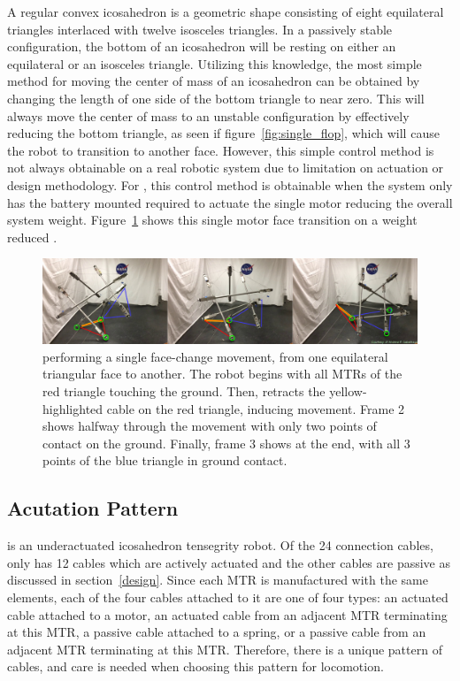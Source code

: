 A regular convex icosahedron is a geometric shape consisting of eight equilateral triangles interlaced with twelve isosceles triangles.
In a passively stable configuration, the bottom of an icosahedron will be resting on either an equilateral or an isosceles triangle.
Utilizing this knowledge, the most simple method for moving the center of mass of an icosahedron can be obtained by changing the length of one side of the bottom triangle to near zero.
This will always move the center of mass to an unstable configuration by effectively reducing the bottom triangle, as seen if figure~\ref{fig:single_flop}, which will cause the robot to transition to another face.
However, this simple control method is not always obtainable on a real robotic system due to limitation on actuation or design methodology.
For \SB{}, this control method is obtainable when the system only has the battery mounted required to actuate the single motor reducing the overall system weight.
Figure~\ref{fig:superball_flop_flat} shows this single motor face transition on a weight reduced \SB{}.

\begin{figure}[thbp]
    \centering
    \includegraphics[width=1\linewidth]{tex/img/superball_flop_combined_betterlabels}
    \caption{\SB{} performing a single face-change movement, from one equilateral triangular face to another. The robot begins with all MTRs of the red triangle touching the ground. Then, \SB{} retracts the yellow-highlighted cable on the red triangle, inducing movement. Frame 2 shows \SB{} halfway through the movement with only two points of contact on the ground. Finally, frame 3 shows \SB{} at the end, with all 3 points of the blue triangle in ground contact.}
    \label{fig:superball_flop_flat}
\end{figure}

\subsection{\SB{} Acutation Pattern}
\label{sec:pattern}
\SB{} is an underactuated icosahedron tensegrity robot.
Of the 24 connection cables, \SB{} only has 12 cables which are actively actuated and the other cables are passive as discussed in section~\ref{design}.
Since each MTR is manufactured with the same elements, each of the four cables attached to it are one of four types: an actuated cable attached to a motor, an actuated cable from an adjacent MTR terminating at this MTR, a passive cable attached to a spring, or a passive cable from an adjacent MTR terminating at this MTR.
Therefore, there is a unique pattern of cables, and care is needed when choosing this pattern for locomotion. 

